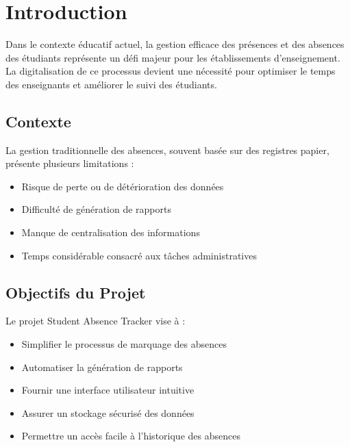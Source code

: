 \section{Introduction}

Dans le contexte éducatif actuel, la gestion efficace des présences et des absences des étudiants représente un défi majeur pour les établissements d'enseignement. La digitalisation de ce processus devient une nécessité pour optimiser le temps des enseignants et améliorer le suivi des étudiants.

\subsection{Contexte}
La gestion traditionnelle des absences, souvent basée sur des registres papier, présente plusieurs limitations :
\begin{itemize}
    \item Risque de perte ou de détérioration des données
    \item Difficulté de génération de rapports
    \item Manque de centralisation des informations
    \item Temps considérable consacré aux tâches administratives
\end{itemize}

\subsection{Objectifs du Projet}
Le projet Student Absence Tracker vise à :
\begin{itemize}
    \item Simplifier le processus de marquage des absences
    \item Automatiser la génération de rapports
    \item Fournir une interface utilisateur intuitive
    \item Assurer un stockage sécurisé des données
    \item Permettre un accès facile à l'historique des absences
\end{itemize}
